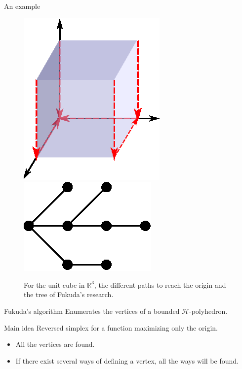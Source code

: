 \begin{frame}{An example}
\begin{figure}
\includegraphics[width=0.35\columnwidth]{images/fukuda.eps}
\includegraphics[width=0.35\columnwidth]{images/fukugraph.eps}

For the unit cube in $\mathbb{R}^3$, the different paths to reach the origin and the tree of Fukuda's research.
\end{figure}
\end{frame}



\begin{frame}{Fukuda's algorithm}
Enumerates the vertices of a bounded $\mathcal{H}$-polyhedron. 

\begin{block}{Main idea}
Reversed simplex for a function maximizing only the origin.
\end{block}

\begin{itemize}
\item All the vertices are found.
\item If there exist several ways of defining a vertex, all the ways will be found.
\end{itemize}
\end{frame}



